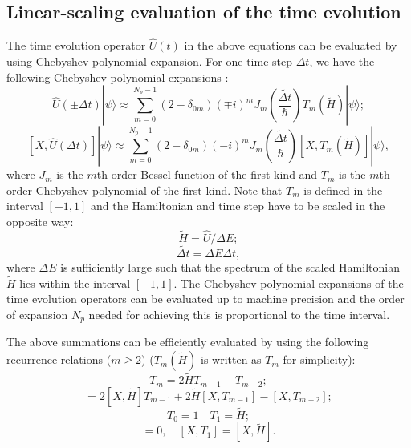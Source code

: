 \documentclass[12pt,a4paper]{report}
\begin{document}
\subsection{Linear-scaling evaluation of the time evolution}

The time evolution operator $\hat{U}(t)$ in the above equations can be evaluated by using Chebyshev polynomial expansion. For one time step $\Delta t$, we have the following Chebyshev polynomial expansions \cite{ezer1984jcp}:
\begin{equation}
\label{equation:cheb_1}
 \hat{U}(\pm \Delta t) |\psi\rangle
 \approx \sum_{m=0}^{N_p-1} (2-\delta_{0m}) (\mp i)^m
         J_m\left( \frac{\widetilde{\Delta t}}{\hbar} \right)
         T_m( \widetilde{H}) |\psi\rangle;
\end{equation}
\begin{equation}
\label{equation:cheb_2}
 [X, \hat{U}(\Delta t)] |\psi\rangle
 \approx \sum_{m=0}^{N_p-1} (2-\delta_{0m}) (-i)^m
J_m\left( \frac{\widetilde{\Delta t}}{\hbar} \right)
[X, T_m(\widetilde{H})] |\psi\rangle,
\end{equation}
where $J_m$ is the $m$th order Bessel function of the first kind and $T_m$ is the $m$th order Chebyshev polynomial of the first kind.
Note that $T_m$ is defined in the interval $[-1,1]$ and the Hamiltonian and time step have to be scaled in the opposite way:
\begin{equation}
\widetilde{H}=\hat{U}/\Delta E;
\end{equation}
\begin{equation}
\widetilde{\Delta t}= \Delta E \Delta t,
\end{equation}
where $\Delta E$ is sufficiently large such that the spectrum of the scaled Hamiltonian $\widetilde{H}$ lies within the interval $[-1,1]$. The Chebyshev polynomial expansions of the time evolution operators can be evaluated up to machine precision and the order of expansion $N_p$ needed for achieving this is proportional to the time interval. 

The above summations can be efficiently evaluated
by using the following  recurrence relations ($m \geq 2$)  ($T_m(\widetilde{H})$ is written as $T_m$ for simplicity):
\begin{equation}
 T_m = 2 \widetilde{H} T_{m-1} - T_{m-2};
\end{equation}
\begin{equation}
[X, T_m] = 2[X, \widetilde{H}] T_{m-1} + 2\widetilde{H} [X, T_{m-1}] - [X, T_{m-2}];
\end{equation}
\begin{equation}
 T_0 = 1 \quad
 T_1 = \widetilde{H};
\end{equation}
\begin{equation}
 [X, T_0] = 0, \quad
 [X, T_1] = [X,\widetilde{H}].
\end{equation}
\end{document}

